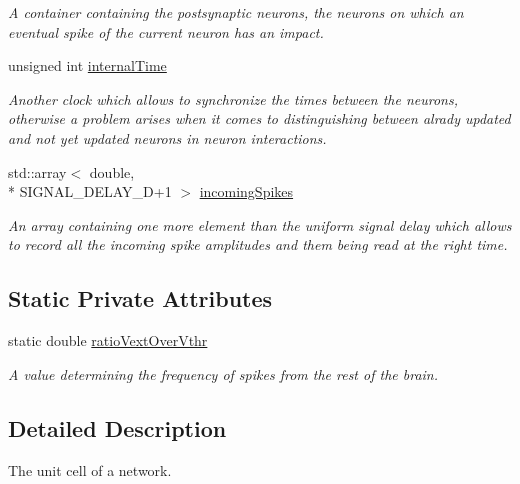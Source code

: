 \begin{DoxyCompactItemize}
\begin{DoxyCompactList}\small\item\em A container containing the postsynaptic neurons, the neurons on which an eventual spike of the current neuron has an impact. \end{DoxyCompactList}\item 
unsigned int \hyperlink{classNeuron_adb1a016b5d339ba3ba95367bb66f391a}{internal\-Time}
\begin{DoxyCompactList}\small\item\em Another clock which allows to synchronize the times between the neurons, otherwise a problem arises when it comes to distinguishing between alrady updated and not yet updated neurons in neuron interactions. \end{DoxyCompactList}\item 
std\-::array$<$ double, \\*
S\-I\-G\-N\-A\-L\-\_\-\-D\-E\-L\-A\-Y\-\_\-\-D+1 $>$ \hyperlink{classNeuron_a15160c28823ad0e63f171af31fd6b1ea}{incoming\-Spikes}
\begin{DoxyCompactList}\small\item\em An array containing one more element than the uniform signal delay which allows to record all the incoming spike amplitudes and them being read at the right time. \end{DoxyCompactList}\end{DoxyCompactItemize}
\subsection*{Static Private Attributes}
\begin{DoxyCompactItemize}
\item 
\hypertarget{classNeuron_a1b5bf86e2ff7636a7e944909e19ec0f6}{static double \hyperlink{classNeuron_a1b5bf86e2ff7636a7e944909e19ec0f6}{ratio\-Vext\-Over\-Vthr}}\label{classNeuron_a1b5bf86e2ff7636a7e944909e19ec0f6}

\begin{DoxyCompactList}\small\item\em A value determining the frequency of spikes from the rest of the brain. \end{DoxyCompactList}\end{DoxyCompactItemize}


\subsection{Detailed Description}
The unit cell of a network. 

